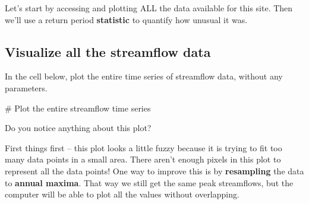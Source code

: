 \documentclass[
  letterpaper,
  DIV=11,
  numbers=noendperiod,
  oneside]{scrreprt}
\newenvironment{Shaded}{\begin{snugshade}}{\end{snugshade}}
\newcommand{\CommentTok}[1]{\textcolor[rgb]{0.37,0.37,0.37}{#1}}
\begin{document}
Let's start by accessing and plotting ALL the data available for this
site. Then we'll use a return period \textbf{statistic} to quantify how
unusual it was.

\subsection{Visualize all the streamflow
data}\label{visualize-all-the-streamflow-data}

\begin{tcolorbox}[enhanced jigsaw, colbacktitle=quarto-callout-color!10!white, opacityback=0, bottomtitle=1mm, toptitle=1mm, bottomrule=.15mm, left=2mm, colframe=quarto-callout-color-frame, leftrule=.75mm, opacitybacktitle=0.6, colback=white, rightrule=.15mm, toprule=.15mm, breakable, titlerule=0mm, title=\textcolor{quarto-callout-color}{\faInfo}\hspace{0.5em}{Try It}, coltitle=black, arc=.35mm]

In the cell below, plot the entire time series of streamflow data,
without any parameters.

\end{tcolorbox}

\begin{Shaded}
\begin{Highlighting}[]
\CommentTok{\# Plot the entire streamflow time series}
\end{Highlighting}
\end{Shaded}

\begin{tcolorbox}[enhanced jigsaw, colbacktitle=quarto-callout-color!10!white, opacityback=0, bottomtitle=1mm, toptitle=1mm, bottomrule=.15mm, left=2mm, colframe=quarto-callout-color-frame, leftrule=.75mm, opacitybacktitle=0.6, colback=white, rightrule=.15mm, toprule=.15mm, breakable, titlerule=0mm, title=\textcolor{quarto-callout-color}{\faInfo}\hspace{0.5em}{Reflect and Respond}, coltitle=black, arc=.35mm]

Do you notice anything about this plot?

\end{tcolorbox}

First things first -- this plot looks a little fuzzy because it is
trying to fit too many data points in a small area. There aren't enough
pixels in this plot to represent all the data points! One way to improve
this is by \textbf{resampling} the data to \textbf{annual maxima}. That
way we still get the same peak streamflows, but the computer will be
able to plot all the values without overlapping.
\end{document}
